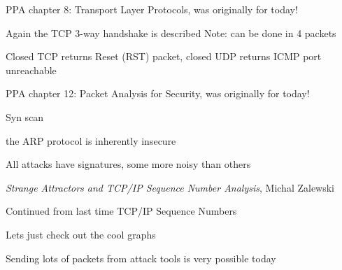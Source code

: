 \documentclass[Screen16to9,17pt]{foils}
\begin{document}


\begin{list1}
\item PPA chapter 8: Transport Layer Protocols, was originally for today!
\begin{list2}
\item Again the TCP 3-way handshake is described Note: can be done in 4 packets
\item Closed TCP returns Reset (RST) packet, closed UDP returns ICMP port unreachable
\end{list2}
\end{list1}




\begin{list1}
\item PPA chapter 12: Packet Analysis for Security, was originally for today!
\begin{list2}
\item Syn scan
\item the ARP protocol is inherently insecure
\item All attacks have signatures, some more noisy than others
\end{list2}
\end{list1}




\emph{Strange Attractors and TCP/IP Sequence Number Analysis}, Michal Zalewski\\ 

\begin{list1}
\item Continued from last time TCP/IP Sequence Numbers
\begin{list2}
\item Lets just check out the cool graphs
\item Sending lots of packets from attack tools is very possible today
\end{list2}
\end{list1}


\end{document}
